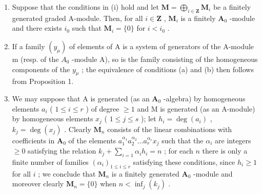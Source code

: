 \begin{enumerate}
\def\labelenumi{(\roman{enumi})}
\setcounter{enumi}{1}
\item
  Suppose that the conditions in (i) hold and let \(\mathbf{M} = \bigoplus_{i\in \mathbf{Z}}\mathbf{M}_i\) be a finitely generated graded A-module. Then, for all \(i\in \mathbf{Z}\) , \(\mathbf{M}_i\) is a finitely \(\mathbf{A}_0\) -module and there exists \(i_0\) such that \(\mathbf{M}_i = \{0\}\) for \(i < i_0\) .
\item
  If a family \((y_{\mu})\) of elements of A is a system of generators of the A-module m (resp. of the \(A_{0}\) -module A), so is the family consisting of the homogeneous components of the \(y_{\mu}\) ; the equivalence of conditions (a) and (b) then follows from Proposition 1.
\item
  We may suppose that A is generated (as an \(\mathbf{A}_0\) -algebra) by homogeneous elements \(a_i\) ( \(1 \leqslant i \leqslant r\) ) of degree \(\geqslant 1\) and M is generated (as an A-module) by homogeneous elements \(x_j\) ( \(1 \leqslant j \leqslant s\) ); let \(h_i = \deg(a_i)\) , \(k_j = \deg(x_j)\) . Clearly \(\mathbf{M}_n\) consists of the linear combinations with coefficients in \(\mathbf{A}_0\) of the elements \(a_1^{\alpha_1} a_2^{\alpha_2} \ldots a_r^{\alpha_r} x_j\) such that the \(\alpha_i\) are integers \(\geqslant 0\) satisfying the relation \(k_j + \sum_{i=1} \alpha_i h_i = n\) ; for each \(n\) there is only a finite number of families \((\alpha_i)_{1 \leqslant i \leqslant r}\) satisfying these conditions, since \(h_i \geqslant 1\) for all \(i\) ; we conclude that \(\mathbf{M}_n\) is a finitely generated \(\mathbf{A}_0\) -module and moreover clearly \(\mathbf{M}_n = \{0\}\) when \(n < \inf_{j}(k_j)\) .
\end{enumerate}

